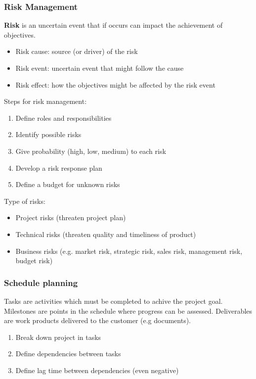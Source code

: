 \subsubsection{Risk Management}
\textbf{Risk} is an uncertain event that if occurs can impact the achievement of objectives.
\begin{itemize}
    \item Risk cause: source (or driver) of the risk
    \item Risk event: uncertain event that might follow the cause
    \item Risk effect: how the objectives might be affected by the risk event
\end{itemize}
Steps for risk management:
\begin{enumerate}
    \item Define roles and responsibilities
    \item Identify possible risks
    \item Give probability (high, low, medium) to each risk
    \item Develop a risk response plan
    \item Define a budget for unknown risks
\end{enumerate}
Type of risks:
\begin{itemize}
    \item Project risks (threaten project plan)
    \item Technical risks (threaten quality and timeliness of product)
    \item Business risks (e.g. market risk, strategic risk, sales risk, management risk, budget risk)
\end{itemize}

\subsubsection{Schedule planning}
Tasks are activities which must be completed to achive the project goal.
Milestones are points in the schedule where progress can be assessed.
Deliverables are work products delivered to the customer (e.g documents).

\begin{enumerate}
    \item Break down project in tasks
    \item Define dependencies between tasks
    \item Define lag time between dependencies (even negative)
\end{enumerate}

